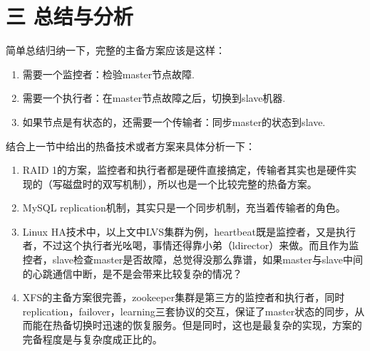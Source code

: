 \section* {\Large \ZHH 三 总结与分析} {
    {简单总结归纳一下，完整的主备方案应该是这样：}\par
    \begin{enumerate}
    \item{需要一个{\color{red}监控者}：检验master节点故障.}
    \item{需要一个{\color{red}执行者}：在master节点故障之后，切换到slave机器.}
    \item{如果节点是有状态的，还需要一个{\color{red}传输者}：同步master的状态到slave.}
    \end{enumerate}\par

    {结合上一节中给出的热备技术或者方案来具体分析一下：}\par
    \begin{enumerate}
    \item{RAID 1的方案，监控者和执行者都是硬件直接搞定，传输者其实也是硬件实现的（写磁盘时的双写机制），所以也是一个比较完整的热备方案。}
    \item{MySQL replication机制，其实只是一个同步机制，充当着传输者的角色。}
    \item{Linux HA技术中，以上文中LVS集群为例，heartbeat既是监控者，又是执行者，不过这个执行者光吆喝，事情还得靠小弟（ldirector）来做。而且作为监控者，slave检查master是否故障，总觉得没那么靠谱，如果master与slave中间的心跳通信中断，是不是会带来比较复杂的情况？}
    \item{XFS的主备方案很完善，zookeeper集群是第三方的监控者和执行者，同时replication，failover，learning三套协议的交互，保证了master状态的同步，从而能在热备切换时迅速的恢复服务。但是同时，这也是最复杂的实现，方案的完备程度是与复杂度成正比的。}
    \end{enumerate}
}


